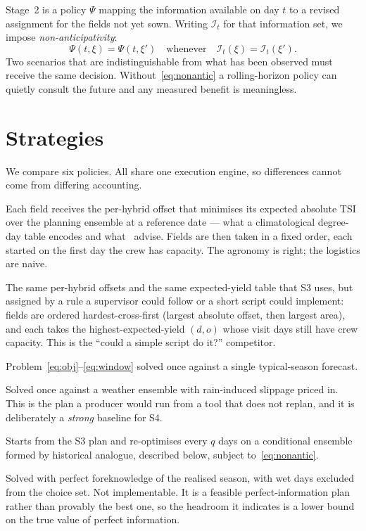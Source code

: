 \documentclass[10pt,twocolumn]{article}
\begin{document}
Stage~2 is a policy $\Psi$ mapping the information available on day $t$ to a
revised assignment for the fields not yet sown. Writing $\mathcal{I}_t$ for
that information set, we impose \emph{non-anticipativity}:
\begin{equation}
\Psi(t,\xi) = \Psi(t,\xi') \quad \text{whenever} \quad
\mathcal{I}_t(\xi) = \mathcal{I}_t(\xi').
\label{eq:nonantic}
\end{equation}
Two scenarios that are indistinguishable from what has been observed must
receive the same decision. Without~\eqref{eq:nonantic} a rolling-horizon
policy can quietly consult the future and any measured benefit is
meaningless.

\section{Strategies}
\label{sec:strategies}

We compare six policies. All share one execution engine, so differences
cannot come from differing accounting.

\begin{description}
\itemsep1pt
\item[\textbf{S1 Current practice.}] Each field receives the per-hybrid
offset that minimises its expected absolute TSI over the planning
ensemble at a reference date --- what a climatological degree-day table
encodes and what~\cite{chassaigne2021,asefa2024} advise. Fields are then
taken in a fixed order, each started on the first day the crew has
capacity. The agronomy is right; the logistics are naive.
\item[\textbf{S1$'$ Greedy dispatch.}] The same per-hybrid offsets and the
same expected-yield table that S3 uses, but assigned by a rule a supervisor
could follow or a short script could implement: fields are ordered
hardest-cross-first (largest absolute offset, then largest area), and each
takes the highest-expected-yield $(d,o)$ whose visit days still have crew
capacity. This is the ``could a simple script do it?'' competitor.
\item[\textbf{S2 Static (EV).}] Problem~\eqref{eq:obj}--\eqref{eq:window}
solved once against a single typical-season forecast.
\item[\textbf{S3 Static (robust).}] Solved once against a weather ensemble
with rain-induced slippage priced in. This is the plan a producer would
run from a tool that does not replan, and it is deliberately a
\emph{strong} baseline for S4.
\item[\textbf{S4 Dynamic.}] Starts from the S3 plan and re-optimises every
$q$ days on a conditional ensemble formed by historical analogue, described
below, subject to~\eqref{eq:nonantic}.
\item[\textbf{S5 Wait-and-see.}] Solved with perfect foreknowledge of the
realised season, with wet days excluded from the choice set. Not
implementable. It is a feasible perfect-information plan rather than
provably the best one, so the headroom it indicates is a lower bound on
the true value of perfect information.
\end{description}
\end{document}
